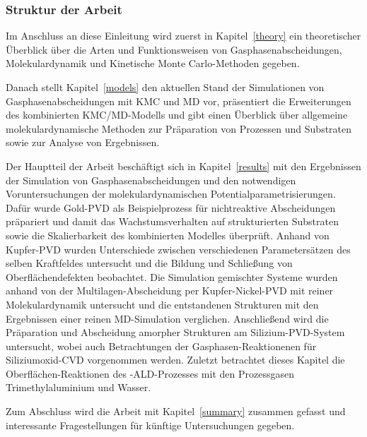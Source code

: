 \subsubsection{Struktur der Arbeit}

Im Anschluss an diese Einleitung wird zuerst in Kapitel~\ref{theory} ein theoretischer Überblick über die Arten und Funktionsweisen von Gasphasenabscheidungen, Molekulardynamik und Kinetische Monte Carlo-Methoden gegeben.

Danach stellt Kapitel~\ref{models} den aktuellen Stand der Simulationen von Gasphasenabscheidungen mit KMC und MD vor, präsentiert die Erweiterungen des kombinierten KMC/MD-Modells und gibt einen Überblick über allgemeine molekulardynamische Methoden zur Präparation von Prozessen und Substraten sowie zur Analyse von Ergebnissen.

Der Hauptteil der Arbeit beschäftigt sich in Kapitel~\ref{results} mit den Ergebnissen der Simulation von Gasphasenabscheidungen und den notwendigen Voruntersuchungen der molekulardynamischen Potentialparametrisierungen.
Dafür wurde Gold-PVD als Beispielprozess für nichtreaktive Abscheidungen präpariert und damit das Wachstumsverhalten auf strukturierten Substraten sowie die Skalierbarkeit des kombinierten Modelles überprüft.
Anhand von Kupfer-PVD wurden Unterschiede zwischen verschiedenen Parametersätzen des selben Kraftfeldes untersucht und die Bildung und Schließung von Oberflächendefekten beobachtet.
Die Simulation gemischter Systeme wurden anhand von der Multilagen-Abscheidung per Kupfer-Nickel-PVD mit reiner Molekulardynamik untersucht und die entstandenen Strukturen mit den Ergebnissen einer reinen MD-Simulation verglichen.
Anschließend wird die Präparation und Abscheidung amorpher Strukturen am Silizium-PVD-System untersucht, wobei auch Betrachtungen der Gasphasen-Reaktionenen für Siliziumoxid-CVD vorgenommen werden.
Zuletzt betrachtet dieses Kapitel die Oberflächen-Reaktionen des -ALD-Prozesses mit den Prozessgasen Trimethylaluminium und Wasser.

Zum Abschluss wird die Arbeit mit Kapitel~\ref{summary} zusammen gefasst und interessante Fragestellungen für künftige Untersuchungen gegeben.
